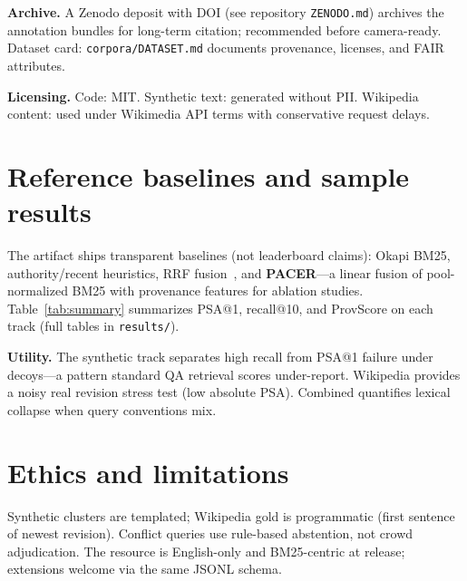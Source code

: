 \documentclass[sigconf]{acmart}
\begin{document}
\textbf{Archive.} A Zenodo deposit with DOI (see repository \texttt{ZENODO.md}) archives the annotation bundles for long-term citation; recommended before camera-ready.
Dataset card: \texttt{corpora/DATASET.md} documents provenance, licenses, and FAIR attributes.

\textbf{Licensing.} Code: MIT. Synthetic text: generated without PII. Wikipedia content: used under Wikimedia API terms with conservative request delays.

\section{Reference baselines and sample results}
The artifact ships transparent baselines (not leaderboard claims): Okapi BM25, authority/recent heuristics, RRF fusion~\cite{cormack2009rrf}, and \textbf{PACER}---a linear fusion of pool-normalized BM25 with provenance features for ablation studies.
Table~\ref{tab:summary} summarizes PSA@1, recall@10, and ProvScore on each track (full tables in \texttt{results/}).

\begin{table}[t]
  \centering
  \footnotesize
  \caption{Reference rankings (existing metrics; $k{=}10$). PACER is a bundled diagnostic reranker.}
  \label{tab:summary}
  
\end{table}

\textbf{Utility.} The synthetic track separates high recall from PSA@1 failure under decoys---a pattern standard QA retrieval scores under-report.
Wikipedia provides a noisy real revision stress test (low absolute PSA).
Combined quantifies lexical collapse when query conventions mix.

\section{Ethics and limitations}
Synthetic clusters are templated; Wikipedia gold is programmatic (first sentence of newest revision).
Conflict queries use rule-based abstention, not crowd adjudication.
The resource is English-only and BM25-centric at release; extensions welcome via the same JSONL schema.



\end{document}

